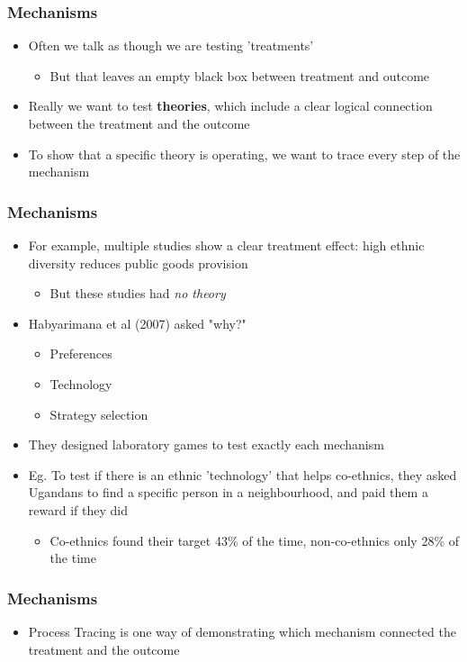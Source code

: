 \documentclass[xcolor=x11names,compress]{beamer}\usepackage[]{graphicx}\usepackage[]{color}
\renewcommand{\(}{\begin{columns}}
\renewcommand{\)}{\end{columns}}
\newcommand{\<}[1]{\begin{column}{#1}}
\renewcommand{\>}{\end{column}}
\begin{document}
\begin{frame}
\frametitle{Mechanisms}
\begin{itemize}
\item Often we talk as though we are testing 'treatments'
\begin{itemize}
\item But that leaves an empty black box between treatment and outcome
\end{itemize}
\item Really we want to test \textbf{theories}, which include a clear logical connection between the treatment and the outcome
\item To show that a specific theory is operating, we want to trace every step of the mechanism
\end{itemize}
\end{frame}

\begin{frame}
\frametitle{Mechanisms}
\begin{itemize}
\item For example, multiple studies show a clear treatment effect: high ethnic diversity reduces public goods provision
\begin{itemize}
\item But these studies had \textit{no theory}
\end{itemize}
\item Habyarimana et al (2007) asked "why?"
\begin{itemize}
\item Preferences
\item Technology
\item Strategy selection
\end{itemize}
\item They designed laboratory games to test exactly each mechanism
\item Eg. To test if there is an ethnic 'technology' that helps co-ethnics, they asked Ugandans to find a specific person in a neighbourhood, and paid them a reward if they did
\begin{itemize}
\item Co-ethnics found their target 43\% of the time, non-co-ethnics only 28\% of the time
\end{itemize}
\end{itemize}
\end{frame}

\begin{frame}
\frametitle{Mechanisms}
\begin{itemize}
\item Process Tracing is one way of demonstrating which mechanism connected the treatment and the outcome 
\end{itemize}
\end{frame}
\end{document}
